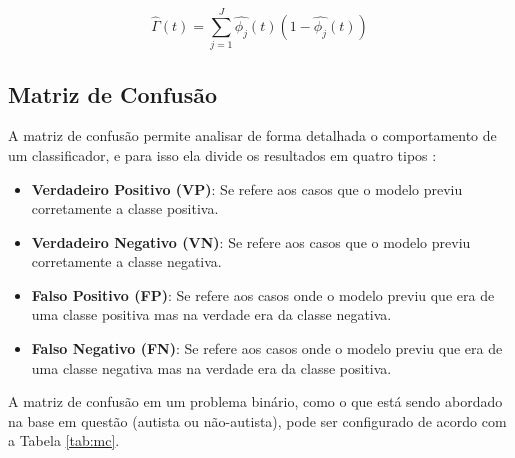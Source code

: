 \documentclass{template/sig-alternate-05-2015}
\begin{document}
    \begin{equation}
      \hat{\Gamma}(t) = \sum_{j=1}^J \hat{\phi_j}(t)(1-\hat{\phi_j}(t))
      \label{eq2}
    \end{equation}

    \subsection{Matriz de Confusão}

    A matriz de confusão permite analisar de forma detalhada o
    comportamento de um classificador, e para isso ela divide os
    resultados em quatro tipos \cite{Talabani:2018}:

    \begin{itemize}
    \item \textbf{Verdadeiro Positivo (VP)}: Se refere aos casos que o
      modelo previu corretamente a classe positiva.
    \item \textbf{Verdadeiro Negativo (VN)}: Se refere aos casos que o
      modelo previu corretamente a classe negativa.
    \item \textbf{Falso Positivo (FP)}: Se refere aos casos onde o
      modelo previu que era de uma classe positiva mas na verdade era
      da classe negativa.
    \item \textbf{Falso Negativo (FN)}: Se refere aos casos onde o
      modelo previu que era de uma classe negativa mas na verdade era
      da classe positiva.
    \end{itemize}

    A matriz de confusão em um problema binário, como o que está sendo
    abordado na base em questão (autista ou não-autista), pode ser
    configurado de acordo com a Tabela \ref{tab:mc}.
\end{document}
